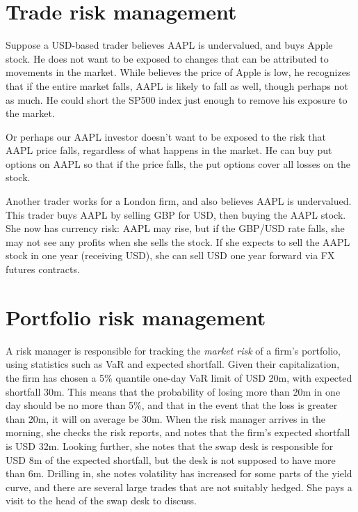 \documentclass{report}
\numberwithin{problem}{chapter} %
\begin{document}
\section{Trade risk management}

Suppose a USD-based trader believes AAPL is undervalued, and buys Apple stock.  He does not want to be exposed to changes that can be attributed to movements in the market. While believes the price of Apple is low, he recognizes that if the entire market falls, AAPL is likely to fall as well, though perhaps not as much. He could short the SP500 index just enough to remove his exposure to the market. 

Or perhaps our AAPL investor doesn't want to be exposed to the risk that AAPL price falls, regardless of what happens in the market. He can buy put options on AAPL so that if the price falls, the put options cover all losses on the stock. 

Another trader works for a London firm, and also believes AAPL is undervalued. This trader buys AAPL by selling GBP for USD, then buying the AAPL stock. She now has currency risk: AAPL may rise, but if the GBP/USD rate falls, she may not see any profits when she sells the stock. If she expects to sell the AAPL stock in one year (receiving USD), she can sell USD one year forward via FX futures contracts. 

\section{Portfolio risk management}

A risk manager is responsible for tracking the {\it market risk} of a firm's portfolio, using statistics such as VaR and expected shortfall. Given their capitalization, the firm has chosen a 5\% quantile one-day VaR limit of USD 20m, with expected shortfall 30m. This means that the probability of losing more than 20m in one day should be no more than 5\%, and that in the event that the loss is greater than 20m, it will on average be 30m. When the risk manager arrives in the morning, she checks the risk reports, and notes that the firm's expected shortfall is USD 32m. Looking further, she notes that the swap desk is responsible for USD 8m of the expected shortfall, but the desk is not supposed to have more than 6m. Drilling in, she notes volatility has increased for some parts of the yield curve, and there are several large trades that are not suitably hedged. She pays a visit to the head of the swap desk to discuss. 
\end{document}
